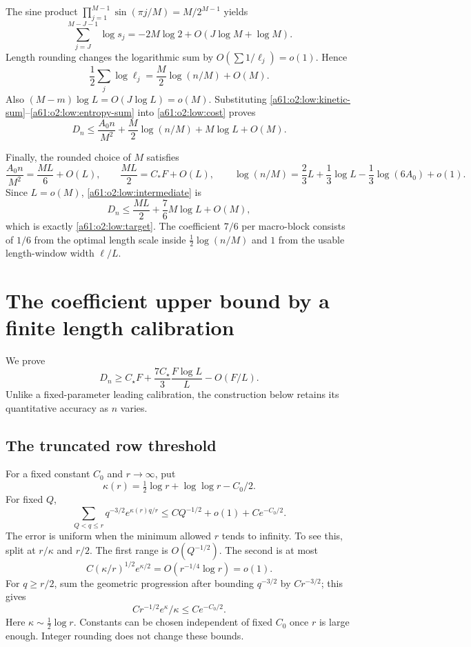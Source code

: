 \documentclass[11pt,letterpaper]{article}
\numberwithin{equation}{section}
\theoremstyle{remark}\newtheorem{remark}[theorem]{Remark}
\newcommand{\st}{\star}
\begin{document}
The sine product
$\prod_{j=1}^{M-1}\sin(\pi j/M)=M/2^{M-1}$ yields
\[
 \sum_{j=J}^{M-J-1}\log s_j
 =-2M\log2+O(J\log M+\log M).
\]
Length rounding changes the logarithmic sum by
$O(\sum1/\ell_j)=o(1)$. Hence
\begin{equation}\label{a61:o2:low:entropy-sum}
 \frac12\sum_j\log\ell_j
   =\frac M2\log(n/M)+O(M).
\end{equation}
Also $(M-m)\log L=O(J\log L)=o(M)$. Substituting
\eqref{a61:o2:low:kinetic-sum}--\eqref{a61:o2:low:entropy-sum} into
\eqref{a61:o2:low:cost} proves
\begin{equation}\label{a61:o2:low:intermediate}
 D_n\le\frac{A_0n}{M^2}
          +\frac M2\log(n/M)+M\log L+O(M).
\end{equation}

Finally, the rounded choice of $M$ satisfies
\[
 \frac{A_0n}{M^2}=\frac{ML}{6}+O(L),\qquad
 \frac{ML}{2}=C_*F+O(L),\qquad
 \log(n/M)=\frac23L+\frac13\log L-\frac13\log(6A_0)+o(1).
\]
Since $L=o(M)$, \eqref{a61:o2:low:intermediate} is
\[
 D_n\le\frac{ML}{2}+\frac76M\log L+O(M),
\]
which is exactly \eqref{a61:o2:low:target}.
The coefficient $7/6$ per macro-block consists of $1/6$ from the
optimal length scale inside $\tfrac12\log(n/M)$ and $1$ from the
usable length-window width $\ell/L$.

\section{The coefficient upper bound by a finite length calibration}\label{a61:o2:sec:upper}
We prove
\begin{equation}\label{a61:o2:upp:target}
 D_n\ge C_\st F+\frac{7C_\st}{3}\frac{F\log L}{L}-O(F/L).
\end{equation}
Unlike a fixed-parameter leading calibration, the construction below retains its quantitative accuracy as $n$ varies.

\subsection{The truncated row threshold}
For a fixed constant $C_0$ and $r\to\infty$, put
\[
 \kappa(r)=\tfrac12\log r+\log\log r-C_0/2.
\]
For fixed $Q$,
\begin{equation}\label{a61:o2:upp:tail}
 \sum_{Q<q\le r}q^{-3/2}e^{\kappa(r)q/r}
 \le C Q^{-1/2}+o(1)+C e^{-C_0/2}.
\end{equation}
The error is uniform when the minimum allowed $r$ tends to infinity. To see this, split at $r/\kappa$ and $r/2$. The first range is $O(Q^{-1/2})$. The second is at most
\[
 C(\kappa/r)^{1/2}e^{\kappa/2}=O(r^{-1/4}\log r)=o(1).
\]
For $q\ge r/2$, sum the geometric progression after bounding $q^{-3/2}$ by $Cr^{-3/2}$; this gives
\[
 Cr^{-1/2}e^\kappa/\kappa\le Ce^{-C_0/2}.
\]
Here $\kappa\sim\tfrac12\log r$. Constants can be chosen independent of fixed $C_0$ once $r$ is large enough. Integer rounding does not change these bounds.
\end{document}
